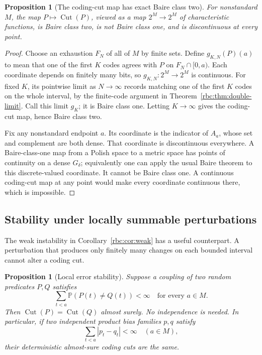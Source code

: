 \documentclass[11pt]{article}
\numberwithin{equation}{section}
\newtheorem{proposition}[theorem]{Proposition}
\theoremstyle{definition}
\theoremstyle{remark}
\newcommand{\Cut}{\operatorname{Cut}}
\newcommand{\Prob}{\mathbb P}
\begin{document}
\begin{proposition}[The coding-cut map has exact Baire class two]
\label{rbc:prop:baire-two}
For nonstandard $M$, the map $P\mapsto\Cut(P)$, viewed as a map
$2^M\to2^M$ of characteristic functions, is Baire class two, is not Baire
class one, and is discontinuous at every point.
\end{proposition}

\begin{proof}
Choose an exhaustion $F_N$ of all of $M$ by finite sets. Define
$g_{K,N}(P)(a)$ to mean that one of the first $K$ codes agrees with $P$ on
$F_N\cap[0,a)$. Each coordinate depends on finitely many bits, so
$g_{K,N}:2^M\to2^M$ is continuous. For fixed $K$, its pointwise limit
as $N\to\infty$ records matching one of the first $K$ codes on the whole
interval, by the finite-code argument in Theorem~\ref{rbc:thm:double-limit}.
Call this limit $g_K$; it is Baire class one. Letting $K\to\infty$ gives
the coding-cut map, hence Baire class two.

Fix any nonstandard endpoint $a$. Its coordinate is the indicator of
$A_a$, whose set and complement are both dense. That coordinate is
discontinuous everywhere. A Baire-class-one map from a Polish space to a
metric space has points of continuity on a dense $G_\delta$; equivalently
one can apply the usual Baire theorem to this discrete-valued coordinate.
It cannot be Baire class one. A continuous coding-cut map at any point
would make every coordinate continuous there, which is impossible.
\end{proof}

\subsection{Stability under locally summable perturbations}

The weak instability in Corollary~\ref{rbc:cor:weak} has a useful counterpart.
A perturbation that produces only finitely many changes on each bounded
interval cannot alter a coding cut.

\begin{proposition}[Local error stability]
\label{rbc:prop:stability}
Suppose a coupling of two random predicates $P,Q$ satisfies
\[
 \sum_{t<a}\Prob(P(t)\ne Q(t))<\infty
 \quad\text{for every }a\in M.
\]
Then $\Cut(P)=\Cut(Q)$ almost surely. No independence is needed. In
particular, if two independent product bias families $p,q$ satisfy
\[
 \sum_{t<a}|p_t-q_t|<\infty\quad(a\in M),
\]
their deterministic almost-sure coding cuts are the same.
\end{proposition}
\end{document}
